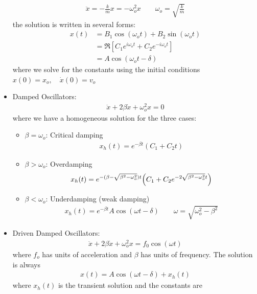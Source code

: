 \documentclass[../main.tex]{subfiles}
\begin{document}
\begin{itemize}
    \begin{align*}
        \ddot x = -\frac{k}{m} x = -\omega_o^2 x \qquad \omega_o = \sqrt{\frac{k}{m}}
    \end{align*}
    the solution is written in several forms:
    \begin{align*}
        x(t) &= B_1 \cos(\omega_o t) + B_2 \sin(\omega_o t) \\
        &= \Re [C_1 e^{i\omega_o t} + C_2 e^{-i\omega_o t}] \\
        &= A \cos(\omega_o t - \delta)
    \end{align*}
    where we solve for the constants using the initial conditions $x(0) = x_o, \quad \dot x(0) = v_o$
    \item Damped Oscillators:
    \begin{align*}
        \ddot x + 2\beta \dot x + \omega_o^2 x = 0
    \end{align*}
    where we have a homogeneous solution for the three cases:
    \begin{itemize}
        \item $\beta = \omega_o$: Critical damping
        \begin{align*}
            x_h(t) = e^{-\beta t}(C_1 + C_2 t)
        \end{align*}
        \item $\beta > \omega_o$: Overdamping
        \begin{align*}
            x_h(t) = e^{-(\beta - \sqrt{\beta^2 - \omega_o^2})t}
                \qt( C_1 + C_2 e^{-2\sqrt{\beta^2 - \omega_o^2}t})
        \end{align*}
        \item $\beta < \omega_o$: Underdamping (weak damping)
        \begin{align*}
            x_h(t) = e^{-\beta t} A \cos(\omega t - \delta) \qquad \omega = \sqrt{\omega_o^2 - \beta^2}
        \end{align*}
    \end{itemize}
    \item Driven Damped Oscillators:
    \begin{align*}
        \ddot x + 2\beta \dot x + \omega_o^2 x = f_0 \cos(\omega t)
    \end{align*}
    where $f_o$ has units of acceleration and $\beta$ has units of frequency. The solution is always
    \begin{align*}
        x(t) = A \cos(\omega t - \delta) + x_h(t)
    \end{align*}
    where $x_h(t)$ is the transient solution and the constants are

\end{itemize}
\end{document}
